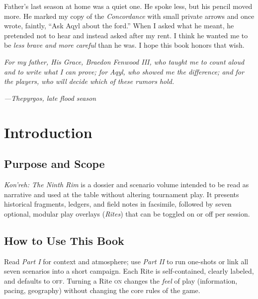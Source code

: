 \documentclass[11pt]{article}
\begin{document}
Father's last season at home was a quiet one. He spoke less, but his pencil moved more. He marked my copy of the \emph{Concordance} with small private arrows and once wrote, faintly, ``Ask Aqyl about the ford.'' When I asked what he meant, he pretended not to hear and instead asked after my rent. I think he wanted me to be \textit{less brave and more careful} than he was. I hope this book honors that wish.

\medskip
\noindent\textit{For my father, His Grace, Braedon Fenwood III, who taught me to count aloud and to write what I can prove; for Aqyl, who showed me the difference; and for the players, who will decide which of these rumors hold.}

\begin{flushright}
\textit{—Thepyrgos, late flood season}
\end{flushright}

\clearpage
\section{Introduction}
\label{sec:introduction}
{}

\subsection{Purpose and Scope}
\textit{Kon'reh: The Ninth Rim} is a dossier and scenario volume intended to be read as narrative and used at the table without altering tournament play. It presents historical fragments, ledgers, and field notes in facsimile, followed by seven optional, modular play overlays (\emph{Rites}) that can be toggled on or off per session.

\subsection{How to Use This Book}
Read \emph{Part I} for context and atmosphere; use \emph{Part II} to run one-shots or link all seven scenarios into a short campaign. Each Rite is self-contained, clearly labeled, and defaults to \textsc{off}. Turning a Rite \textsc{on} changes the \emph{feel} of play (information, pacing, geography) without changing the core rules of the game.
\end{document}
